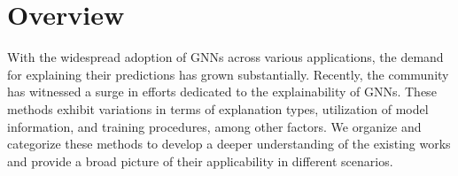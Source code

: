 

\section{Overview}



With the widespread adoption of GNNs across various applications, the demand for explaining their predictions has grown substantially. Recently, the community has witnessed a surge in efforts dedicated to the explainability of GNNs. These methods exhibit variations in terms of explanation types, utilization of model information, and training procedures, among other factors. We organize and categorize these methods to develop a deeper understanding of the existing works and provide a broad picture of their applicability in different scenarios.



